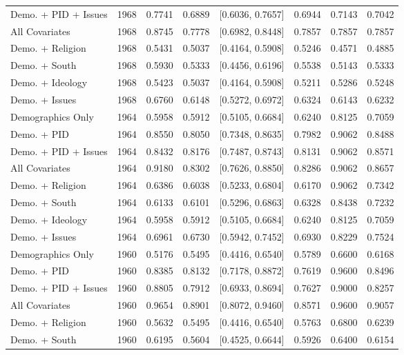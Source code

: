 \begin{longtable}{lrrrlrrr}
  Demo. + PID + Issues & 1968 & 0.7741 & 0.6889 & [0.6036, 0.7657] & 0.6944 & 0.7143 & 0.7042 \\ 
  All Covariates & 1968 & 0.8745 & 0.7778 & [0.6982, 0.8448] & 0.7857 & 0.7857 & 0.7857 \\ 
  Demo. + Religion & 1968 & 0.5431 & 0.5037 & [0.4164, 0.5908] & 0.5246 & 0.4571 & 0.4885 \\ 
  Demo. + South & 1968 & 0.5930 & 0.5333 & [0.4456, 0.6196] & 0.5538 & 0.5143 & 0.5333 \\ 
  Demo. + Ideology & 1968 & 0.5423 & 0.5037 & [0.4164, 0.5908] & 0.5211 & 0.5286 & 0.5248 \\ 
  Demo. + Issues & 1968 & 0.6760 & 0.6148 & [0.5272, 0.6972] & 0.6324 & 0.6143 & 0.6232 \\ 
  Demographics Only & 1964 & 0.5958 & 0.5912 & [0.5105, 0.6684] & 0.6240 & 0.8125 & 0.7059 \\ 
  Demo. + PID & 1964 & 0.8550 & 0.8050 & [0.7348, 0.8635] & 0.7982 & 0.9062 & 0.8488 \\ 
  Demo. + PID + Issues & 1964 & 0.8432 & 0.8176 & [0.7487, 0.8743] & 0.8131 & 0.9062 & 0.8571 \\ 
  All Covariates & 1964 & 0.9180 & 0.8302 & [0.7626, 0.8850] & 0.8286 & 0.9062 & 0.8657 \\ 
  Demo. + Religion & 1964 & 0.6386 & 0.6038 & [0.5233, 0.6804] & 0.6170 & 0.9062 & 0.7342 \\ 
  Demo. + South & 1964 & 0.6133 & 0.6101 & [0.5296, 0.6863] & 0.6328 & 0.8438 & 0.7232 \\ 
  Demo. + Ideology & 1964 & 0.5958 & 0.5912 & [0.5105, 0.6684] & 0.6240 & 0.8125 & 0.7059 \\ 
  Demo. + Issues & 1964 & 0.6961 & 0.6730 & [0.5942, 0.7452] & 0.6930 & 0.8229 & 0.7524 \\ 
  Demographics Only & 1960 & 0.5176 & 0.5495 & [0.4416, 0.6540] & 0.5789 & 0.6600 & 0.6168 \\ 
  Demo. + PID & 1960 & 0.8385 & 0.8132 & [0.7178, 0.8872] & 0.7619 & 0.9600 & 0.8496 \\ 
  Demo. + PID + Issues & 1960 & 0.8805 & 0.7912 & [0.6933, 0.8694] & 0.7627 & 0.9000 & 0.8257 \\ 
  All Covariates & 1960 & 0.9654 & 0.8901 & [0.8072, 0.9460] & 0.8571 & 0.9600 & 0.9057 \\ 
  Demo. + Religion & 1960 & 0.5632 & 0.5495 & [0.4416, 0.6540] & 0.5763 & 0.6800 & 0.6239 \\ 
  Demo. + South & 1960 & 0.6195 & 0.5604 & [0.4525, 0.6644] & 0.5926 & 0.6400 & 0.6154 \\ 

\end{longtable}

